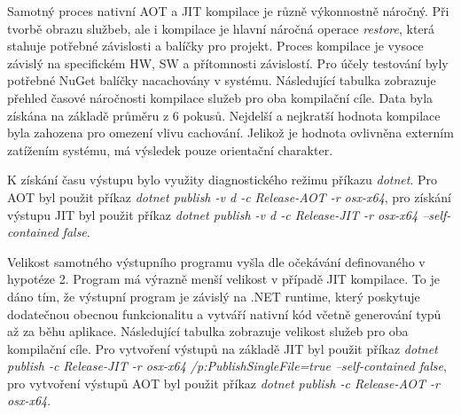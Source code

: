 
Samotný proces nativní AOT a JIT kompilace je různě výkonnostně náročný. Při tvorbě obrazu službeb, ale i kompilace je hlavní náročná operace \emph{restore}, která stahuje potřebné závislosti a balíčky pro projekt. Proces kompilace je vysoce závislý na specifickém HW, SW a přítomnosti závislostí. Pro účely testování byly potřebné NuGet balíčky nacachovány v systému. Následující tabulka zobrazuje přehled časové náročnosti kompilace služeb pro oba kompilační cíle. Data byla získána na základě průměru z 6 pokusů. Nejdelší a nejkratší hodnota kompilace byla zahozena pro omezení vlivu cachování. Jelikož je hodnota ovlivněna externím zatížením systému, má výsledek pouze orientační charakter.

K získání času výstupu bylo využity diagnostického režimu příkazu \emph{dotnet}. Pro AOT byl použit příkaz \emph{dotnet publish -v d -c Release-AOT -r osx-x64}, pro získání výstupu JIT byl použit příkaz \emph{dotnet publish -v d -c Release-JIT -r osx-x64 --self-contained false}.



Velikost samotného výstupního programu vyšla dle očekávání definovaného v hypotéze 2. Program má výrazně menší velikost v případě JIT kompilace. To je dáno tím, že výstupní program je závislý na .NET runtime, který poskytuje dodatečnou obecnou funkcionalitu a vytváří nativní kód včetně generování typů až za běhu aplikace. Následující tabulka zobrazuje velikost služeb pro oba kompilační cíle. Pro vytvoření výstupů na základě JIT byl použit příkaz \emph{dotnet publish -c Release-JIT -r osx-x64 /p:PublishSingleFile=true --self-contained false}, pro vytvoření výstupů AOT byl použit příkaz \emph{dotnet publish -c Release-AOT -r osx-x64}.


